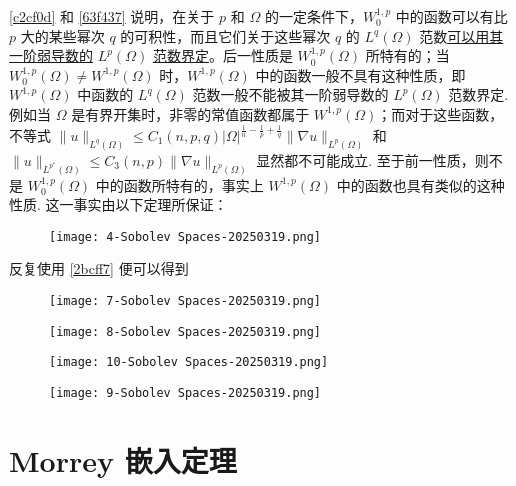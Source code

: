 \cref{c2cf0d} 和 \cref{63f437}  说明，在关于 $p$ 和 $\Omega$ 的一定条件下，$W_0^{1,p}$ 中的函数可以有比 $p$ 大的某些幂次 $q$ 的可积性，而且它们关于这些幂次 $q$ 的 $L^{q}(\Omega)$ 范数\underline{可以用其一阶弱导数的} $L^{p}(\Omega)$ \underline{范数界定}。后一性质是 $W_0^{1,p}(\Omega)$ 所特有的；当 $W_0^{1,p}(\Omega)\neq W^{1,p}(\Omega)$ 时，$W^{1,p}(\Omega)$ 中的函数一般不具有这种性质，即 $W^{1,p}(\Omega)$ 中函数的 $L^{q}(\Omega)$ 范数一般不能被其一阶弱导数的 $L^{p}(\Omega)$ 范数界定. 例如当 $\Omega$ 是有界开集时，非零的常值函数都属于 $W^{1,p}(\Omega)$；而对于这些函数，不等式 $\|u\|_{L^q(\Omega)} \leqslant C_1(n, p, q)|\Omega|^{\frac{1}{n}-\frac{1}{p}+\frac{1}{q}}\|\nabla u\|_{L^p(\Omega)}$ 和 $\|u\|_{L^{p^*}(\Omega)} \leqslant C_3(n, p)\|\nabla u\|_{L^p(\Omega)}$ 显然都不可能成立. 至于前一性质，则不是 $W^{1,p}_{0}(\Omega)$ 中的函数所特有的，事实上 $W^{1,p}(\Omega)$ 中的函数也具有类似的这种性质. 这一事实由以下定理所保证：

\begin{theorem}
\begin{figure}[H]
\centering
\texttt{[image: 4-Sobolev Spaces-20250319.png]}
\label{}
\end{figure}\label{2bcff7}
\end{theorem}

反复使用 \cref{2bcff7}  便可以得到

\begin{theorem}
\begin{figure}[H]
\centering
\texttt{[image: 7-Sobolev Spaces-20250319.png]}
\label{}
\end{figure}
\begin{figure}[H]
\centering
\texttt{[image: 8-Sobolev Spaces-20250319.png]}
\label{}
\end{figure}
\end{theorem}
\begin{figure}[H]
\centering
\texttt{[image: 10-Sobolev Spaces-20250319.png]}
\label{}
\end{figure}

\begin{figure}[H]
\centering
\texttt{[image: 9-Sobolev Spaces-20250319.png]}
\label{}
\end{figure}

\section{Morrey 嵌入定理}

